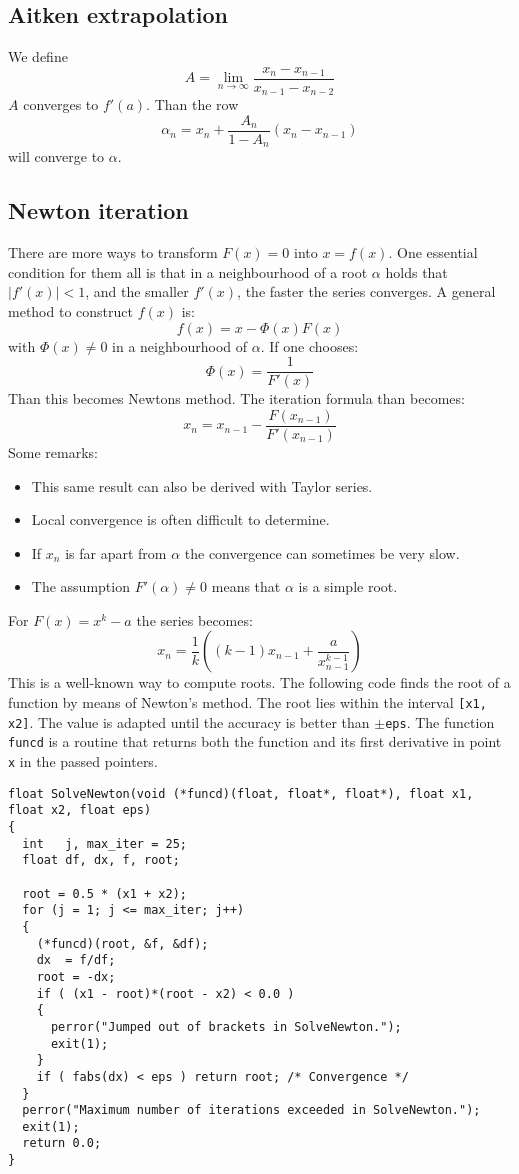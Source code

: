 \documentclass[a4paper,fancyheadings,twoside]{report}
\begin{document}
\subsection{Aitken extrapolation}
We define
\[
A=\lim_{n\rightarrow\infty}\frac{x_n-x_{n-1}}{x_{n-1}-x_{n-2}}
\]
$A$ converges to $f'(a)$. Than the row
\[
\alpha_n=x_n+\frac{A_n}{1-A_n}(x_n-x_{n-1})
\]
will converge to $\alpha$.

\subsection{Newton iteration}
There are more ways to transform $F(x)=0$ into $x=f(x)$. One essential
condition for them all is that in a neighbourhood of a root $\alpha$ holds
that $|f'(x)|<1$, and the smaller $f'(x)$, the faster the series converges.
A general method to construct $f(x)$ is:
\[
f(x)=x-\Phi(x)F(x)
\]
with $\Phi(x)\neq0$ in a neighbourhood of $\alpha$. If one chooses:
\[
\Phi(x)=\frac{1}{F'(x)}
\]
Than this becomes Newtons method. The iteration formula than becomes:
\[
x_n=x_{n-1}-\frac{F(x_{n-1})}{F'(x_{n-1})}
\]
Some remarks:
\begin{itemize}
\item This same result can also be derived with Taylor series.
\item Local convergence is often difficult to determine.
\item If $x_n$ is far apart from $\alpha$ the convergence can sometimes be very slow.
\item The assumption $F'(\alpha)\neq0$ means that $\alpha$ is a simple root.
\end{itemize}
For $F(x)=x^k-a$ the series becomes:
\[
x_n=\frac{1}{k}\left((k-1)x_{n-1}+\frac{a}{x_{n-1}^{k-1}}\right)
\]
This is a well-known way to compute roots.
\npar
The following code finds the root of a function by means of Newton's method. The
root lies within the interval {\tt [x1, x2]}. The value is adapted until the
accuracy is better than {\tt$\pm$eps}. The function {\tt funcd} is a routine
that returns both the function and its first derivative in point {\tt x} in the
passed pointers.
\begin{verbatim}
float SolveNewton(void (*funcd)(float, float*, float*), float x1, float x2, float eps)
{
  int   j, max_iter = 25;
  float df, dx, f, root;

  root = 0.5 * (x1 + x2);
  for (j = 1; j <= max_iter; j++)
  {
    (*funcd)(root, &f, &df);
    dx  = f/df;
    root = -dx;
    if ( (x1 - root)*(root - x2) < 0.0 )
    {
      perror("Jumped out of brackets in SolveNewton.");
      exit(1);
    }
    if ( fabs(dx) < eps ) return root; /* Convergence */
  }
  perror("Maximum number of iterations exceeded in SolveNewton.");
  exit(1);
  return 0.0;
}
\end{verbatim}
\end{document}
